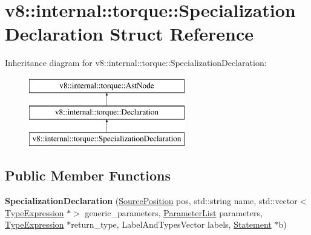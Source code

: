 \hypertarget{structv8_1_1internal_1_1torque_1_1SpecializationDeclaration}{}\section{v8\+:\+:internal\+:\+:torque\+:\+:Specialization\+Declaration Struct Reference}
\label{structv8_1_1internal_1_1torque_1_1SpecializationDeclaration}
Inheritance diagram for v8\+:\+:internal\+:\+:torque\+:\+:Specialization\+Declaration\+:\begin{figure}[H]
\begin{center}
\leavevmode
\includegraphics[height=3.000000cm]{structv8_1_1internal_1_1torque_1_1SpecializationDeclaration}
\end{center}
\end{figure}
\subsection*{Public Member Functions}
\begin{DoxyCompactItemize}
\item 
\mbox{\label{structv8_1_1internal_1_1torque_1_1SpecializationDeclaration_ae3748efcf4b3bf5d1bbfc045f0e684ea}} 
{\bfseries Specialization\+Declaration} (\mbox{\hyperlink{structv8_1_1internal_1_1torque_1_1SourcePosition}{Source\+Position}} pos, std\+::string name, std\+::vector$<$ \mbox{\hyperlink{structv8_1_1internal_1_1torque_1_1TypeExpression}{Type\+Expression}} $\ast$$>$ generic\+\_\+parameters, \mbox{\hyperlink{structv8_1_1internal_1_1torque_1_1ParameterList}{Parameter\+List}} parameters, \mbox{\hyperlink{structv8_1_1internal_1_1torque_1_1TypeExpression}{Type\+Expression}} $\ast$return\+\_\+type, Label\+And\+Types\+Vector labels, \mbox{\hyperlink{structv8_1_1internal_1_1torque_1_1Statement}{Statement}} $\ast$b)
\end{DoxyCompactItemize}
